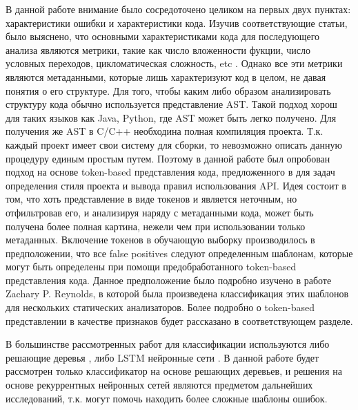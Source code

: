 В данной работе внимание было сосредоточено целиком на первых двух пунктах: характеристики ошибки и характеристики кода. Изучив соответствующие статьи, было выяснено, что основными характеристиками кода для последующего анализа являются метрики, такие как число вложенности фукции, число условных переходов, цикломатическая сложность, etc \cite{test-suites-for-dataset}. Однако все эти метрики являются метаданными, которые лишь характеризуют код в целом, не давая понятия о его структуре. Для того, чтобы каким либо образом анализировать структуру кода обычно используется представление AST\cite{Shedko2020ApplyingPM}. Такой подход хорош для таких языков как Java, Python, где AST может быть легко получено. Для получения же AST в C/C++ необходина полная компиляция проекта. Т.к. каждый проект имеет свои систему для сборки, то невозможно описать данную процедуру единым простым путем. Поэтому в данной работе был опробован подход на основе token-based представления кода, предложенного в \cite{Shedko2020ApplyingPM} для задач определения стиля проекта и вывода правил использования API. Идея состоит в том, что хоть представление в виде токенов и является неточным, но отфильтровав его, и анализируя наряду с метаданными кода, может быть получена более полная картина, нежели чем при использовании только метаданных. Включение токенов в обучающую выборку производилось в предположении, что все false positives следуют определенным шаблонам, которые могут быть определены при помощи предобработанного token-based представления кода. Данное предположение было подробно изучено в работе Zachary P. Reynolds\cite{Reynolds}, в которой была произведена классификация этих шаблонов для нескольких статических анализаторов. Более подробно о token-based представлении в качестве признаков будет рассказано в соответствующем разделе.

В большинстве рассмотренных работ для классификации используются либо решающие деревья , либо LSTM нейронные сети\cite{test-suites-for-dataset} \cite{assesing-validity-of-sa-warnings-cisco}. В данной работе будет рассмотрен только классификатор на основе решающих деревьев, и решения на основе рекуррентных нейронных сетей являются предметом дальнейших исследований, т.к. могут помочь находить более сложные шаблоны ошибок.

